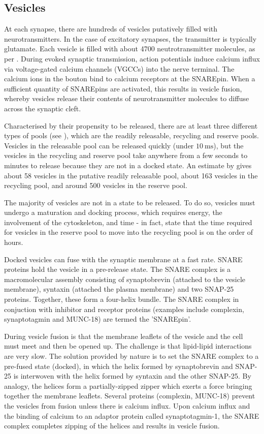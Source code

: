 \documentclass[a4paper]{article}
\begin{document}
\subsection{Vesicles}
\label{sec:vesicles}
At each synapse, there are hundreds of vesicles putatively filled with neurotransmitters. In the case of excitatory synapses, the transmitter is typically glutamate. Each vesicle is filled with about 4700 neutrotransmitter molecules, as per \cite{Bruns:Nature:1995}. During evoked synaptic transmission, action potentials induce calcium influx via voltage-gated calcium channels (VGCCs) into the nerve terminal. The calcium ions in the bouton bind to calcium receptors at the SNAREpin. When a sufficient quantity of SNAREpins are activated, this results in vesicle fusion, whereby vesicles release their contents of neurotransmitter molecules to diffuse across the synaptic cleft.

Characterised by their propensity to be released, there are at least three different types of pools (see \cite{rizzoli2005synaptic}), which are the readily releasable, recycling and reserve pools. Vesicles in the releasable pool can be released quickly (under $\SI{10}{\milli\second}$), but the vesicles in the recycling and reserve pool take anywhere from a few seconds to minutes to release because they are not in a docked state. An estimate by \cite{Rollehagen::2015} gives about 58 vesicles in the putative readily releasable pool, about 163 vesicles in the recycling pool, and around 500 vesicles in the reserve pool.

The majority of vesicles are not in a state to be released. To do so, vesicles must undergo a maturation and docking process, which requires energy, the involvement of the cytoskeleton, and time - in fact, \cite{rizzoli2005synaptic} state that the time required for vesicles in the reserve pool to move into the recycling pool is on the order of hours.

Docked vesicles can fuse with the synaptic membrane at a fast rate. SNARE  proteins hold the vesicle in a pre-release state. The SNARE complex is a macromolecular assembly consisting of synaptobrevin (attached to the vesicle membrane), syntaxin (attached the plasma membrane) and two SNAP-25 proteins. Together, these form a four-helix bundle. The SNARE complex in conjuction with inhibitor and receptor proteins (examples include complexin, synaptotagmin and MUNC-18) are termed the 'SNAREpin'.

During vesicle fusion is that the membrane leaflets of the vesicle and the cell must meet and then be opened up. The challenge is that lipid-lipid interactions are very slow. The solution provided by nature is to set the SNARE complex to a pre-fused state (docked), in which the helix formed by synaptobrevin and SNAP-25 is interwoven with the helix formed by syntaxin and the other SNAP-25. By analogy, the helices form a partially-zipped zipper which exerts a force bringing together the membrane leaflets. Several proteins (complexin, MUNC-18) prevent the vesicles from fusion unless there is calcium influx. Upon calcium influx and the binding of calcium to an adaptor protein called synaptotagmin-1, the SNARE complex completes zipping of the helices and results in vesicle fusion. 
\end{document}
